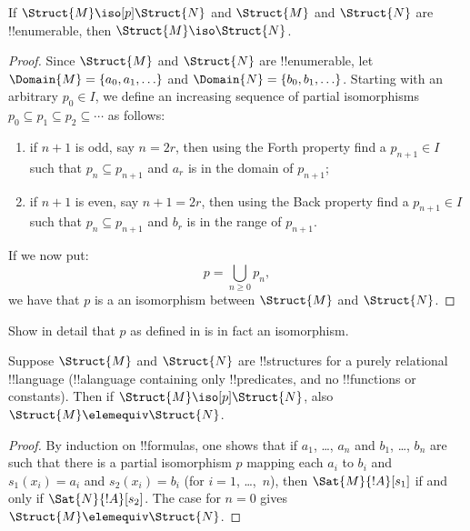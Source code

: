\documentclass[../../../include/open-logic-section]{subfiles}
\begin{document}
\begin{thm}
  If $\Struct{M} \iso[p] \Struct{N}$ and $\Struct{M}$ and
  $\Struct{N}$ are !!{enumerable}, then $\Struct{M} \iso
  \Struct{N}$.
\end{thm}

\begin{proof}
  Since $\Struct{M}$ and $\Struct{N}$ are !!{enumerable}, let $\Domain{M} =
  \{a_0, a_1, \ldots \}$ and $\Domain{N} = \{b_0, b_1, \ldots \}$. Starting
  with an arbitrary $p_0 \in I$, we define an increasing
  sequence of partial isomorphisms $p_0 \subseteq p_1 \subseteq p_2
  \subseteq \cdots$ as follows:
  \begin{enumerate}
  \item if $n+1$ is odd, say $n = 2r$, then using the Forth property
    find a $p_{n+1} \in I$ such that $p_n \subseteq p_{n+1}$
    and $a_r$ is in the domain of $p_{n+1}$;
  \item if $n+1$ is even, say $n+1 =2r$, then using the Back property
    find a $p_{n+1} \in I$ such that $p_n \subseteq p_{n+1}$
    and $b_r$ is in the range of $p_{n+1}$.
  \end{enumerate}
If we now put:
\[
p = \bigcup_{n\ge 0} p_n,
\]
we have that $p$ is a an isomorphism between $\Struct{M}$ and
$\Struct{N}$.
\end{proof}

\begin{prob}
  Show in detail that $p$ as defined in
   is in fact an isomorphism.
\end{prob}

\begin{thm}
  Suppose $\Struct{M}$ and $\Struct{N}$ are !!{structure}s for a
  purely relational !!{language} (!!a{language} containing only
  !!{predicate}s, and no !!{function}s or constants). Then if
  $\Struct{M} \iso[p] \Struct{N}$, also $\Struct{M} \elemequiv
  \Struct{N}$.
\end{thm}

\begin{proof}
  By induction on !!{formula}s, one shows that if $a_1$, \dots, $a_n$ and
  $b_1$, \dots, $b_n$ are such that there is a partial isomorphism $p$
  mapping each $a_i$ to $b_i$ and $s_1(x_i) =a_i$ and $s_2(x_i) =b_i$
  (for $i =1$, \dots,~$n$), then $\Sat{M}{!A}[s_1]$ if
  and only if $\Sat{N}{!A}[s_2]$. The case for $n=0$
  gives $\Struct{M} \elemequiv \Struct{N}$.
\end{proof}
\end{document}
